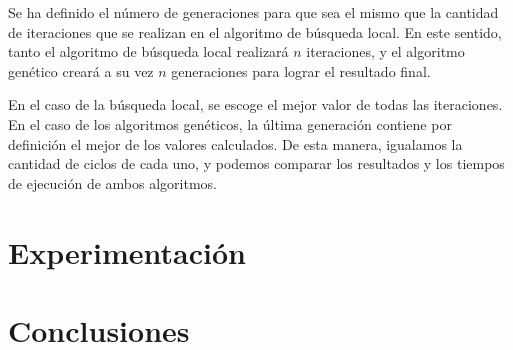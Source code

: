 \documentclass[10pt,a4paper]{article}
\begin{document}
Se ha definido el número de generaciones para que sea el mismo que la cantidad de iteraciones que se realizan en el algoritmo de búsqueda local. En este sentido, tanto el algoritmo de búsqueda local realizará $n$ iteraciones, y el algoritmo genético creará a su vez $n$ generaciones para lograr el resultado final. 

En el caso de la búsqueda local, se escoge el mejor valor de todas las iteraciones. En el caso de los algoritmos genéticos, la última generación contiene por definición el mejor de los valores calculados. De esta manera, igualamos la cantidad de ciclos de cada uno, y podemos comparar los resultados y los tiempos de ejecución de ambos algoritmos.

\section{Experimentación}


\section{Conclusiones}


{}

\end{document}
